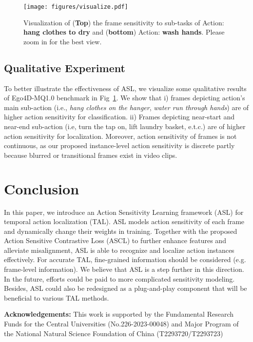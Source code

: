 \documentclass[10pt,twocolumn,letterpaper]{article}
\begin{document}
\begin{figure}[t]
\centering
\texttt{[image: figures/visualize.pdf]}
\caption{Visualization of (\textbf{Top}) the frame sensitivity to sub-tasks of Action: \textbf{hang clothes to dry} and (\textbf{bottom}) Action: \textbf{wash hands}. Please zoom in for the best view.}
\label{fig:visualize}
\end{figure}

\subsection{Qualitative Experiment}
To better illustrate the effectiveness of ASL, we visualize some qualitative results of Ego4D-MQ1.0 benchmark in Fig~\ref{fig:visualize}. We show that i) frames depicting action's main sub-action (i.e., \textit{hang clothes on the hanger}, \textit{water run through hands}) are of higher action sensitivity for classification. ii) Frames depicting near-start and near-end sub-action (i.e, turn the tap on, lift laundry basket, e.t.c.) are of higher action sensitivity for localization. Moreover, action sensitivity of frames is not continuous, as our proposed instance-level action sensitivity is discrete partly because blurred or transitional frames exist in video clips.

\vspace{2.3em}
\section{Conclusion}
In this paper, we introduce an Action Sensitivity Learning framework (ASL) for temporal action localization (TAL). ASL models action sensitivity of each frame and dynamically change their weights in training. Together with the proposed Action Sensitive Contrastive Loss (ASCL) to further enhance features and alleviate misalignment,  ASL is able to recognize and localize action instances effectively.  For accurate TAL, fine-grained information should be considered (e.g. frame-level information). We believe that ASL is a step further in this direction. In the future, efforts could be paid to more complicated sensitivity modeling. Besides, ASL could also be redesigned as a plug-and-play component that will be beneficial to various TAL methods.

\textbf{Acknowledgements:} This work is supported by the Fundamental Research
Funds for the Central Universities (No.226-2023-00048) and Major Program of the National Natural Science Foundation of China (T2293720/T2293723)

\clearpage
{\small


}
\end{document}
